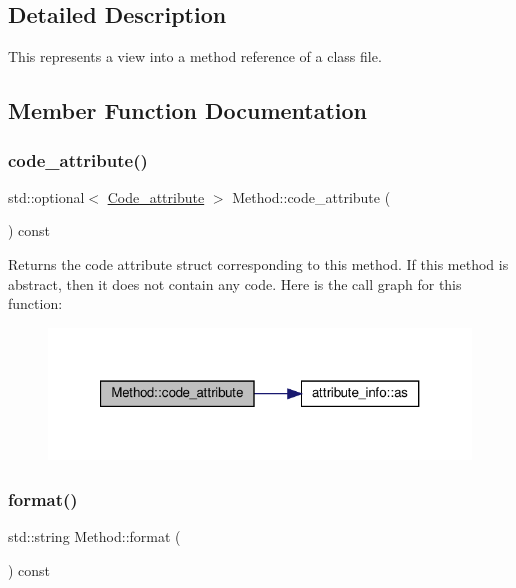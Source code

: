 \subsection{Detailed Description}
This represents a view into a method reference of a class file. 

\subsection{Member Function Documentation}
\mbox{\label{classMethod_af92b40aa1a81df3a6827d688adc005bf}} 
\subsubsection{\texorpdfstring{code\+\_\+attribute()}{code\_attribute()}}
{\footnotesize\ttfamily std\+::optional$<$ \hyperlink{structCode__attribute}{Code\+\_\+attribute} $>$ Method\+::code\+\_\+attribute (\begin{DoxyParamCaption}{ }\end{DoxyParamCaption}) const}

Returns the code attribute struct corresponding to this method. If this method is abstract, then it does not contain any code. Here is the call graph for this function\+:\nopagebreak
\begin{figure}[H]
\begin{center}
\leavevmode
\includegraphics[width=321pt]{classMethod_af92b40aa1a81df3a6827d688adc005bf_cgraph}
\end{center}
\end{figure}
\mbox{\label{classMethod_a3f6d55a368a1e2727bea0799c3cdc0f6}} 
\subsubsection{\texorpdfstring{format()}{format()}}
{\footnotesize\ttfamily std\+::string Method\+::format (\begin{DoxyParamCaption}{ }\end{DoxyParamCaption}) const}

